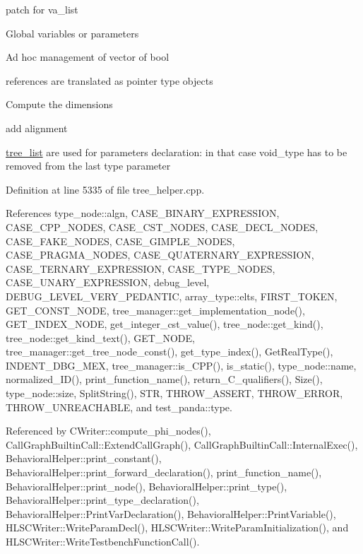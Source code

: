 patch for va\+\_\+list

Global variables or parameters

Ad hoc management of vector of bool

references are translated as pointer type objects

Compute the dimensions

add alignment

\hyperlink{structtree__list}{tree\+\_\+list} are used for parameters declaration\+: in that case void\+\_\+type has to be removed from the last type parameter 

Definition at line 5335 of file tree\+\_\+helper.\+cpp.



References type\+\_\+node\+::algn, C\+A\+S\+E\+\_\+\+B\+I\+N\+A\+R\+Y\+\_\+\+E\+X\+P\+R\+E\+S\+S\+I\+ON, C\+A\+S\+E\+\_\+\+C\+P\+P\+\_\+\+N\+O\+D\+ES, C\+A\+S\+E\+\_\+\+C\+S\+T\+\_\+\+N\+O\+D\+ES, C\+A\+S\+E\+\_\+\+D\+E\+C\+L\+\_\+\+N\+O\+D\+ES, C\+A\+S\+E\+\_\+\+F\+A\+K\+E\+\_\+\+N\+O\+D\+ES, C\+A\+S\+E\+\_\+\+G\+I\+M\+P\+L\+E\+\_\+\+N\+O\+D\+ES, C\+A\+S\+E\+\_\+\+P\+R\+A\+G\+M\+A\+\_\+\+N\+O\+D\+ES, C\+A\+S\+E\+\_\+\+Q\+U\+A\+T\+E\+R\+N\+A\+R\+Y\+\_\+\+E\+X\+P\+R\+E\+S\+S\+I\+ON, C\+A\+S\+E\+\_\+\+T\+E\+R\+N\+A\+R\+Y\+\_\+\+E\+X\+P\+R\+E\+S\+S\+I\+ON, C\+A\+S\+E\+\_\+\+T\+Y\+P\+E\+\_\+\+N\+O\+D\+ES, C\+A\+S\+E\+\_\+\+U\+N\+A\+R\+Y\+\_\+\+E\+X\+P\+R\+E\+S\+S\+I\+ON, debug\+\_\+level, D\+E\+B\+U\+G\+\_\+\+L\+E\+V\+E\+L\+\_\+\+V\+E\+R\+Y\+\_\+\+P\+E\+D\+A\+N\+T\+IC, array\+\_\+type\+::elts, F\+I\+R\+S\+T\+\_\+\+T\+O\+K\+EN, G\+E\+T\+\_\+\+C\+O\+N\+S\+T\+\_\+\+N\+O\+DE, tree\+\_\+manager\+::get\+\_\+implementation\+\_\+node(), G\+E\+T\+\_\+\+I\+N\+D\+E\+X\+\_\+\+N\+O\+DE, get\+\_\+integer\+\_\+cst\+\_\+value(), tree\+\_\+node\+::get\+\_\+kind(), tree\+\_\+node\+::get\+\_\+kind\+\_\+text(), G\+E\+T\+\_\+\+N\+O\+DE, tree\+\_\+manager\+::get\+\_\+tree\+\_\+node\+\_\+const(), get\+\_\+type\+\_\+index(), Get\+Real\+Type(), I\+N\+D\+E\+N\+T\+\_\+\+D\+B\+G\+\_\+\+M\+EX, tree\+\_\+manager\+::is\+\_\+\+C\+P\+P(), is\+\_\+static(), type\+\_\+node\+::name, normalized\+\_\+\+I\+D(), print\+\_\+function\+\_\+name(), return\+\_\+\+C\+\_\+qualifiers(), Size(), type\+\_\+node\+::size, Split\+String(), S\+TR, T\+H\+R\+O\+W\+\_\+\+A\+S\+S\+E\+RT, T\+H\+R\+O\+W\+\_\+\+E\+R\+R\+OR, T\+H\+R\+O\+W\+\_\+\+U\+N\+R\+E\+A\+C\+H\+A\+B\+LE, and test\+\_\+panda\+::type.



Referenced by C\+Writer\+::compute\+\_\+phi\+\_\+nodes(), Call\+Graph\+Builtin\+Call\+::\+Extend\+Call\+Graph(), Call\+Graph\+Builtin\+Call\+::\+Internal\+Exec(), Behavioral\+Helper\+::print\+\_\+constant(), Behavioral\+Helper\+::print\+\_\+forward\+\_\+declaration(), print\+\_\+function\+\_\+name(), Behavioral\+Helper\+::print\+\_\+node(), Behavioral\+Helper\+::print\+\_\+type(), Behavioral\+Helper\+::print\+\_\+type\+\_\+declaration(), Behavioral\+Helper\+::\+Print\+Var\+Declaration(), Behavioral\+Helper\+::\+Print\+Variable(), H\+L\+S\+C\+Writer\+::\+Write\+Param\+Decl(), H\+L\+S\+C\+Writer\+::\+Write\+Param\+Initialization(), and H\+L\+S\+C\+Writer\+::\+Write\+Testbench\+Function\+Call().

